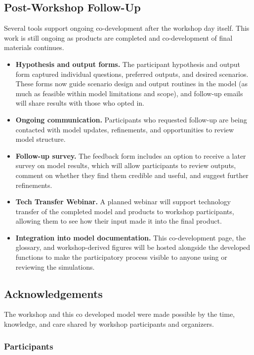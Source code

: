 \documentclass[
]{book}
\begin{document}
\subsection{Post-Workshop Follow-Up}\label{post-workshop-follow-up}

Several tools support ongoing co-development after the workshop day itself. This work is still ongoing as products are completed and co-development of final materials continues.

\begin{itemize}
\item
  \textbf{Hypothesis and output forms.} The participant hypothesis and output form captured individual questions, preferred outputs, and desired scenarios. These forms now guide scenario design and output routines in the model (as much as feasible within model limitations and scope), and follow-up emails will share results with those who opted in.
\item
  \textbf{Ongoing communication.} Participants who requested follow-up are being contacted with model updates, refinements, and opportunities to review model structure.
\item
  \textbf{Follow-up survey.} The feedback form includes an option to receive a later survey on model results, which will allow participants to review outputs, comment on whether they find them credible and useful, and suggest further refinements.
\item
  \textbf{Tech Transfer Webinar.} A planned webinar will support technology transfer of the completed model and products to workshop participants, allowing them to see how their input made it into the final product.
\item
  \textbf{Integration into model documentation.} This co-development page, the glossary, and workshop-derived figures will be hosted alongside the developed functions to make the participatory process visible to anyone using or reviewing the simulations.
\end{itemize}

\subsection{Acknowledgements}\label{acknowledgements}

The workshop and this co developed model were made possible by the time, knowledge, and care shared by workshop participants and organizers.

\subsubsection{Participants}\label{participants}
\end{document}
